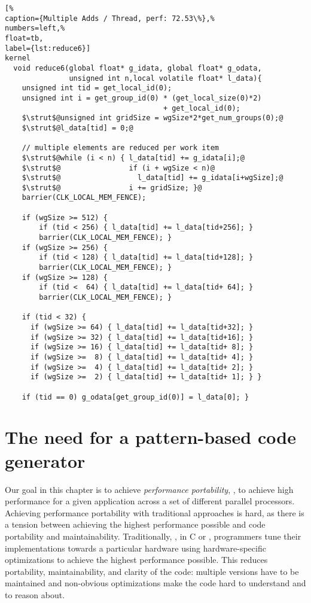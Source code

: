 \begin{lstlisting}[%                                                             
caption={Multiple Adds / Thread, perf: 72.53\%},%
numbers=left,%
float=tb,
label={lst:reduce6}]
kernel
  void reduce6(global float* g_idata, global float* g_odata,
               unsigned int n,local volatile float* l_data){
    unsigned int tid = get_local_id(0);
    unsigned int i = get_group_id(0) * (get_local_size(0)*2)
                                     + get_local_id(0);
    $\strut$@unsigned int gridSize = wgSize*2*get_num_groups(0);@
    $\strut$@l_data[tid] = 0;@

    // multiple elements are reduced per work item
    $\strut$@while (i < n) { l_data[tid] += g_idata[i];@
    $\strut$@                if (i + wgSize < n)@
    $\strut$@                  l_data[tid] += g_idata[i+wgSize];@
    $\strut$@                i += gridSize; }@
    barrier(CLK_LOCAL_MEM_FENCE);

    if (wgSize >= 512) {
        if (tid < 256) { l_data[tid] += l_data[tid+256]; }
        barrier(CLK_LOCAL_MEM_FENCE); }
    if (wgSize >= 256) {
        if (tid < 128) { l_data[tid] += l_data[tid+128]; }
        barrier(CLK_LOCAL_MEM_FENCE); }
    if (wgSize >= 128) {
        if (tid <  64) { l_data[tid] += l_data[tid+ 64]; }
        barrier(CLK_LOCAL_MEM_FENCE); }
    
    if (tid < 32) {
      if (wgSize >= 64) { l_data[tid] += l_data[tid+32]; }
      if (wgSize >= 32) { l_data[tid] += l_data[tid+16]; }
      if (wgSize >= 16) { l_data[tid] += l_data[tid+ 8]; }
      if (wgSize >=  8) { l_data[tid] += l_data[tid+ 4]; }
      if (wgSize >=  4) { l_data[tid] += l_data[tid+ 2]; }
      if (wgSize >=  2) { l_data[tid] += l_data[tid+ 1]; } }
    
    if (tid == 0) g_odata[get_group_id(0)] = l_data[0]; }
\end{lstlisting}

\section{The need for a pattern-based code generator}

Our goal in this chapter is to achieve \emph{performance portability}, \ie, to achieve high performance for a given application across a set of different parallel processors.
Achieving performance portability with traditional approaches is hard, as there is a tension between achieving the highest performance possible and code portability and maintainability.
Traditionally, \eg, in C or \OpenCL, programmers tune their implementations towards a particular hardware using hardware-specific optimizations to achieve the highest performance possible.
This reduces portability, maintainability, and clarity of the code:
multiple versions have to be maintained and non-obvious optimizations make the code hard to understand and to reason about.

